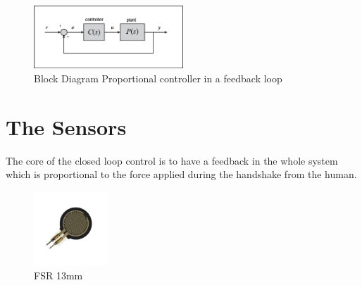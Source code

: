 \begin{figure}[h]
\centering
\includegraphics[width=0.5\textwidth]{Figure/feedbackP.png}
\caption{Block Diagram Proportional controller in a feedback loop}
\label{Fig:Pr}
\end{figure}


\section{The Sensors}
The core of the closed loop control is to have a feedback in the whole system which is proportional to the force applied during the handshake from the human. 
\begin{figure}
\centering
\includegraphics[width=0.25\textwidth]{Figure/fsrsingle1.jpg}
\caption{FSR 13mm}
\label{Fig:FSRsingle}
\end{figure}

